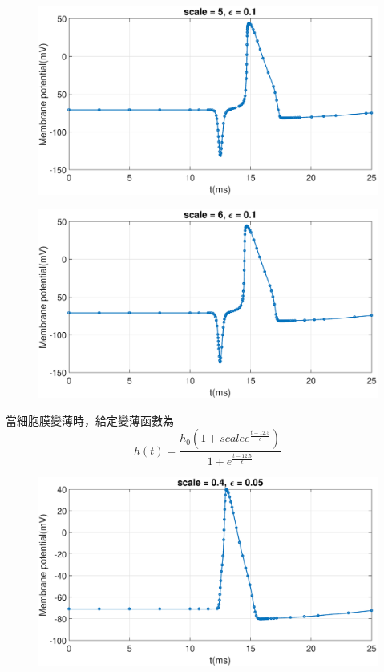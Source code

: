 \documentclass[12pt,a4paper]{article}
\begin{document}
\begin{CJK}{UTF8}{bsmi}
\begin{figure}[htbp]
		\end{figure}
		\begin{figure}[htbp]
			\centering
			\includegraphics[width = 500pt]{51.eps}
		\end{figure}
		\begin{figure}[htbp]
			\centering
			\includegraphics[width = 500pt]{61.eps}
		\end{figure}
	\newpage
	當細胞膜變薄時，給定變薄函數為
	$$h(t)=\frac{h_0(1+scale e^{\frac{t-12.5}{\epsilon}})}{1+e^{\frac{t-12.5}{\epsilon}}}$$
	\begin{figure}[htbp]
		\centering
		\includegraphics[width = 500pt]{405.eps}

\end{figure}
\end{CJK}
\end{document}
